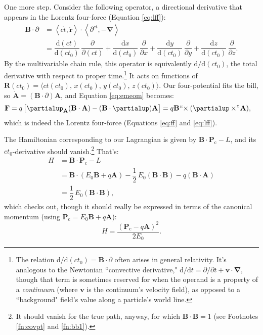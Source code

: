 \documentclass[12pt]{article}
\renewcommand{\vv}[1]{\mathbf{#1}}
\newcommand{\dd}[1]{\mathrm{d}#1}
\newcommand{\del}{\boldsymbol{\nabla}}
\begin{document}
One more step. Consider the following operator, a directional derivative that appears in the Lorentz four-force (Equation \ref{eq:lff}):
\begin{equation*}
\begin{split}
\vv B \cdot \partialup &= \left \langle c \mathring{t}, \mathring{\vv r} \right \rangle \cdot \left \langle \partial^{ct}, - \del \right \rangle \\[4pt]
&= \dfrac{\dd (ct)}{\dd (ct_0)} \, \dfrac{\partial}{\partial (ct)} + \dfrac{\dd x}{\dd (ct_0)} \, \dfrac{\partial}{\partial x} +  \dfrac{\dd y}{\dd (ct_0)} \, \dfrac{\partial}{\partial y} + \dfrac{\dd z}{\dd (ct_0)} \, \dfrac{\partial}{\partial z} .
\end{split}
\end{equation*}
By the multivariable chain rule, this operator is equivalently $\dd / \dd (ct_0)$, the total derivative with respect to proper time.\footnote{The relation $\dd / \dd (ct_0) = \vv B \cdot \partialup$ often arises in general relativity. It's analogous to the Newtonian ``convective derivative," ${\dd / \dd t = \partial / \partial t + \vv v \cdot \del}$, though that term is sometimes reserved for when the operand is a property of a \emph{continuum} (where $\vv v$ is the continuum's velocity field), as opposed to a ``background" field's value along a particle's world line.} It acts on functions of ${\vv R (ct_0) = \langle ct (ct_0), \, x (ct_0), \, y (ct_0), \, z (ct_0) \rangle}$. Our four-potential fits the bill, so $\mathring{\vv A} = (\vv B \cdot \partialup) \vv A $, and Equation \ref{eq:emeom} becomes:
\begin{equation*}
\begin{split}
\vv F &= q \, \bigl[ \partialup_{\vv A} (\vv B \cdot \vv A) - (\vv B \cdot \partialup) \vv A \bigr] = q \vv B \mkern1mu `` \mkern-4mu \times (\partialup \times \mkern-4mu " \mkern1mu \vv A) ,
\end{split}
\end{equation*}
which is indeed the Lorentz four-force (Equations \ref{eq:ff} and \ref{eq:lff}).

The Hamiltonian corresponding to our Lagrangian is given by $ \vv B \cdot \vv P _\mathrm{c} - L $, and its $ct_0$-derivative should vanish.\footnote{It should vanish for the true path, anyway, for which $\vv B \cdot \vv B = 1$ (see Footnotes \ref{fn:covpt} and \ref{fn:bb1}).} That's:
\begin{equation*}
\begin{split}
H &= \vv B \cdot \vv P_\mathrm{c} - L \\
&= \vv B \cdot \left( E_0 \vv B + q \vv A \right) - \dfrac{1}{2} \, E_0 (\vv B \cdot \vv B) - q (\vv B \cdot \vv A) \\
&= \dfrac{1}{2} \, E_0 (\vv B \cdot \vv B) ,
\end{split}
\end{equation*}
which checks out, though it should really be expressed in terms of the canonical momentum (using $\vv P_\mathrm{c} = E_0 \vv B + q \vv A $):
\begin{equation*}
H = \dfrac{\left( \vv P_\mathrm{c} - q \vv A \right) ^2}{2 E_0} .
\end{equation*}
\end{document}
